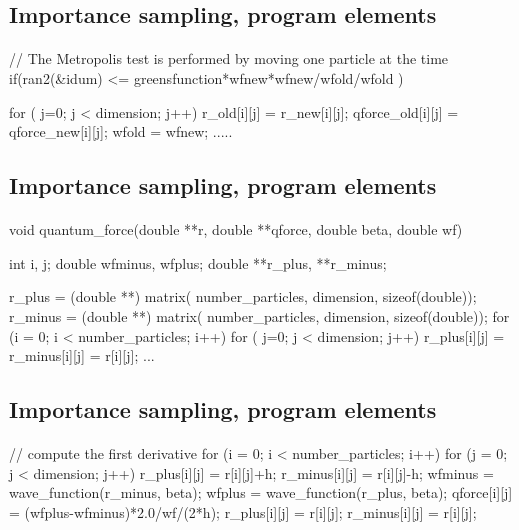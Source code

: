 \documentclass[%
twoside,                 %
final,                   %
10pt]{article}
\begin{document}
{{{{\ecppcod




\subsection{Importance sampling, program elements}

\paragraph{}
\bcppcod
 	// The Metropolis test is performed by moving one particle  at the time
	if(ran2(&idum) <= greensfunction*wfnew*wfnew/wfold/wfold ) { 
	  for ( j=0; j < dimension; j++) {
	    r_old[i][j] = r_new[i][j];
	    qforce_old[i][j] = qforce_new[i][j];
	  }
	  wfold = wfnew;
          .....
\ecppcod




\subsection{Importance sampling, program elements}

\paragraph{}
\bcppcod
void  quantum_force(double **r, double **qforce, double beta, double wf)
{
  int i, j;
  double wfminus, wfplus; 
  double **r_plus, **r_minus;

  r_plus = (double **) matrix( number_particles, dimension, sizeof(double));
  r_minus = (double **) matrix( number_particles, dimension, sizeof(double));
  for (i = 0; i < number_particles; i++) { 
    for ( j=0; j < dimension; j++) {
      r_plus[i][j] = r_minus[i][j] = r[i][j];
    }
  }
...
\ecppcod



\subsection{Importance sampling, program elements}

\paragraph{}
\bcppcod
  // compute the first derivative
  for (i = 0; i < number_particles; i++) {
    for (j = 0; j < dimension; j++) { 
      r_plus[i][j] = r[i][j]+h;
      r_minus[i][j] = r[i][j]-h;
      wfminus = wave_function(r_minus, beta); 
      wfplus  = wave_function(r_plus, beta); 
      qforce[i][j] = (wfplus-wfminus)*2.0/wf/(2*h);
      r_plus[i][j] = r[i][j];
      r_minus[i][j] = r[i][j];
    }
  }
\ecppcod




}}}}}}
\end{document}
